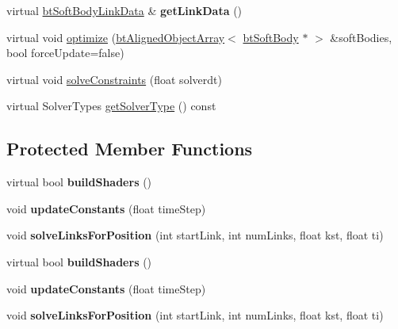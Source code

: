 \begin{DoxyCompactItemize}
\item 
\mbox{\label{classbtDX11SIMDAwareSoftBodySolver_accfffb882c6629a00c55ee1d75c53a78}} 
virtual \hyperlink{classbtSoftBodyLinkData}{bt\+Soft\+Body\+Link\+Data} \& {\bfseries get\+Link\+Data} ()
\item 
virtual void \hyperlink{classbtDX11SIMDAwareSoftBodySolver_a438ad9c2749189a20c5c950023893f76}{optimize} (\hyperlink{classbtAlignedObjectArray}{bt\+Aligned\+Object\+Array}$<$ \hyperlink{classbtSoftBody}{bt\+Soft\+Body} $\ast$ $>$ \&soft\+Bodies, bool force\+Update=false)
\item 
virtual void \hyperlink{classbtDX11SIMDAwareSoftBodySolver_a952ce0e7cf089b1eee2db1f75319ec27}{solve\+Constraints} (float solverdt)
\item 
virtual Solver\+Types \hyperlink{classbtDX11SIMDAwareSoftBodySolver_ad36369c7c58e1cb8ddea7ebd54612eb9}{get\+Solver\+Type} () const
\end{DoxyCompactItemize}
\subsection*{Protected Member Functions}
\begin{DoxyCompactItemize}
\item 
\mbox{\label{classbtDX11SIMDAwareSoftBodySolver_a370bf1175e4be8711daf9dcdb2ffdd9e}} 
virtual bool {\bfseries build\+Shaders} ()
\item 
\mbox{\label{classbtDX11SIMDAwareSoftBodySolver_a4576ee44e738b592728890c05ae8b6f1}} 
void {\bfseries update\+Constants} (float time\+Step)
\item 
\mbox{\label{classbtDX11SIMDAwareSoftBodySolver_af1749124332e58c27611ac90bb34f73e}} 
void {\bfseries solve\+Links\+For\+Position} (int start\+Link, int num\+Links, float kst, float ti)
\item 
\mbox{\label{classbtDX11SIMDAwareSoftBodySolver_ad3d4a7c202d5fa2ac9f0474fa25b1c72}} 
virtual bool {\bfseries build\+Shaders} ()
\item 
\mbox{\label{classbtDX11SIMDAwareSoftBodySolver_a4576ee44e738b592728890c05ae8b6f1}} 
void {\bfseries update\+Constants} (float time\+Step)
\item 
\mbox{\label{classbtDX11SIMDAwareSoftBodySolver_af1749124332e58c27611ac90bb34f73e}} 
void {\bfseries solve\+Links\+For\+Position} (int start\+Link, int num\+Links, float kst, float ti)
\end{DoxyCompactItemize}
